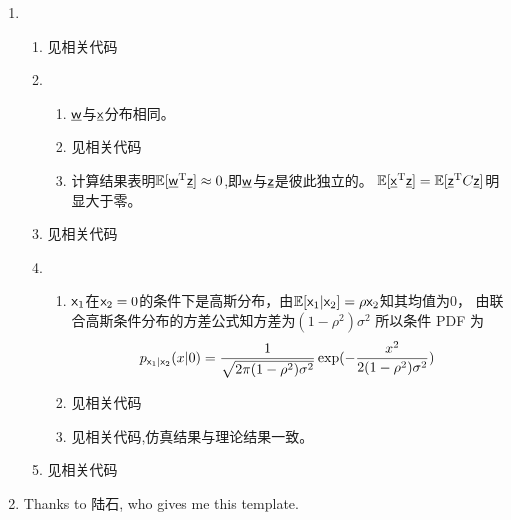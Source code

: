 \documentclass[a4paper]{article}
\begin{document}
\begin{enumerate}[label=\thehwcnt.\arabic*.]
  \setlength{\itemsep}{3\parskip}
  \setcounter{enumi}{3}
  \item 
    \begin{enumerate}[label=(\alph*)]
    \item 见相关代码
    \item 
        \begin{enumerate}[label=\roman*.]
        \item $\underline{\mathsf{w}}$与$\underline{\mathsf{x}}$分布相同。
        \item 见相关代码
        \item 计算结果表明$\operatorname{\mathbb{E}}[\underline{\mathsf{w}}^{\mathrm{T}}\underline{\mathsf{z}}]\approx 0$,即$\underline{\mathsf{w}}$与$\underline{\mathsf{z}}$是彼此独立的。
        $\operatorname{\mathbb{E}}[\underline{\mathsf{x}}^{\mathrm{T}}\underline{\mathsf{z}}]=\operatorname{\mathbb{E}}[\underline{\mathsf{z}}^{\mathrm{T}} C \underline{\mathsf{z}}]$明显大于零。
        \end{enumerate}   
    \item 见相关代码
    \item 
        \begin{enumerate}[label=\roman*.]
        \item $\mathsf{x}_1$在$\mathsf{x}_2=0$的条件下是高斯分布，由$\operatorname{\mathbb{E}}[\mathsf{x}_1|\mathsf{x}_2]=\rho \mathsf{x}_2$知其均值为0，
        由联合高斯条件分布的方差公式知方差为$(1-\rho^2)\sigma^2$
        所以条件 PDF 为
        \begin{equation}
            p_{\mathsf{x}_1|\mathsf{x}_2}(x|0)=\frac{1}{\sqrt{2\pi(1-\rho^2)\sigma^2}}\exp(-\frac{x^2}{2(1-\rho^2)\sigma^2})
        \end{equation}
        \item 见相关代码
        \item 见相关代码,仿真结果与理论结果一致。
        \end{enumerate}       
    \item 见相关代码
    \end{enumerate}   
  \item Thanks to 陆石, who gives me this template.
  

\end{enumerate}
\end{document}
